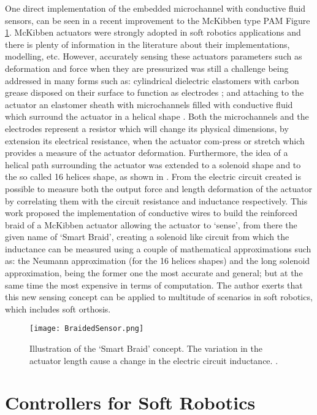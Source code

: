 One direct implementation of the embedded microchannel with conductive fluid sensors, can be seen in a recent improvement to the McKibben type PAM Figure \ref{fig:braided_sensor}. McKibben actuators were strongly adopted in soft robotics applications and there is plenty of information in the literature about their implementations, modelling, etc. However, accurately sensing these actuators parameters such as deformation and force when they are pressurized was still a challenge being addressed in many forms such as: cylindrical dielectric elastomers with carbon grease disposed on their surface to function as electrodes \cite{Goulbourne2007}; and attaching to the actuator an elastomer sheath with microchannels filled with conductive fluid which surround the actuator in a helical shape \cite{Park2013}. Both the microchannels and the electrodes represent a resistor which will change its physical dimensions, by extension its electrical resistance, when the actuator com-press or stretch which provides a measure of the actuator deformation. Furthermore, the idea of a helical path surrounding the actuator was extended to a solenoid shape and to the so called 16 helices shape, as shown in \cite{Felt2014,Felt2015}. From the electric circuit created is possible to measure both the output force and length deformation of the actuator by correlating them with the circuit resistance and inductance respectively. This work proposed the implementation of conductive wires to build the reinforced braid of a McKibben actuator allowing the actuator to `sense', from there the given name of `Smart Braid', creating a solenoid like circuit from which the inductance can be measured using a couple of mathematical approximations such as: the Neumann approximation (for the 16 helices shapes) and the long solenoid approximation, being the former one the most accurate and general; but at the same time the most expensive in terms of computation. The author exerts that this new sensing concept can be applied to multitude of scenarios in soft robotics, which includes soft orthosis.

\begin{figure}[hb!]
    \centering
    \texttt{[image: BraidedSensor.png]}
    \caption{Illustration of the `Smart Braid' concept. The variation in the actuator length cause a change in the electric circuit inductance. \cite{Felt2015}. }
    \label{fig:braided_sensor}
\end{figure}

\section{Controllers for Soft Robotics}

